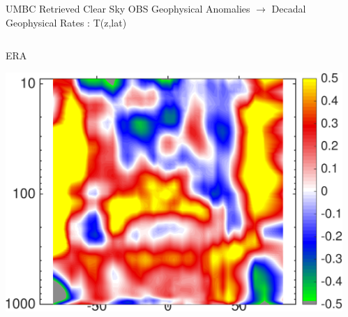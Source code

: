 \documentclass[10pt,t]{beamer}
\begin{document}

\begin{frame}{UMBC Retrieved Clear Sky OBS Geophysical Anomalies $\rightarrow$ Decadal Geophysical Rates : T(z,lat)}
\vspace{-0.35in}

\begin{columns}
\begin{column}{0.45\columnwidth}
\begin{block}{\footnotesize ERA}
\vspace{-0.1in}
\begin{center}
\includegraphics[width=\linewidth]{Figs/ClearAnom/rawERAtzrates.png}
\end{center}
\end{block}
\end{column}

\begin{column}{0.45\columnwidth}
\end{column}
\end{columns}

\vspace{-0.25in}


\end{frame}
\end{document}
